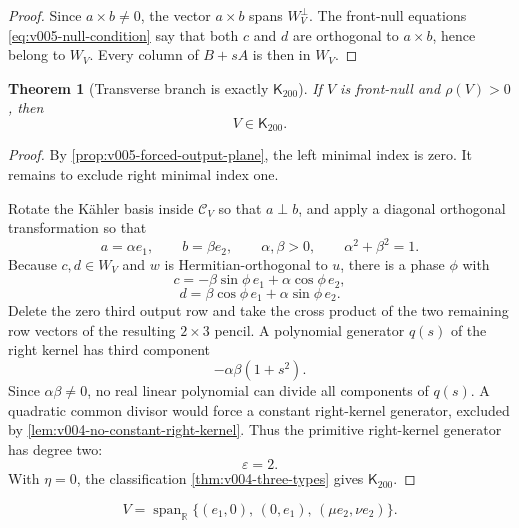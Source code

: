 \documentclass[10pt]{article}
\newtheorem{theorem}{Theorem}[section]
\newcommand{\R}{\mathbb R}
\begin{document}
\begin{proof}
Since \(a\times b\neq0\), the vector \(a\times b\) spans \(W_V^\perp\).  The front-null equations
\eqref{eq:v005-null-condition} say that both \(c\) and \(d\) are orthogonal to \(a\times b\),
hence belong to \(W_V\).  Every column of \(B+sA\) is then in \(W_V\).
\end{proof}

\begin{theorem}[Transverse branch is exactly \(\mathsf K_{200}\)]
\label{thm:v005-transverse-K200}
If \(V\) is front-null and \(\rho(V)>0\), then
\begin{equation}
\label{eq:v005-transverse-K200}
\boxed{
V\in\mathsf K_{200}.
}
\end{equation}
\end{theorem}

\begin{proof}
By \cref{prop:v005-forced-output-plane}, the left minimal index is zero.  It remains to exclude
right minimal index one.

Rotate the K\"ahler basis inside \(\mathcal C_V\) so that \(a\perp b\), and apply a diagonal
orthogonal transformation so that
\[
a=\alpha e_1,
\qquad
b=\beta e_2,
\qquad
\alpha,\beta>0,
\qquad
\alpha^2+\beta^2=1.
\]
Because \(c,d\in W_V\) and \(w\) is Hermitian-orthogonal to \(u\), there is a phase \(\phi\) with
\[
c=
-\beta\sin\phi\,e_1
+
\alpha\cos\phi\,e_2,
\]
\[
d=
\beta\cos\phi\,e_1
+
\alpha\sin\phi\,e_2.
\]
Delete the zero third output row and take the cross product of the two remaining row vectors of the
resulting \(2\times3\) pencil.  A polynomial generator \(q(s)\) of the right kernel has third
component
\[
-\alpha\beta(1+s^2).
\]
Since \(\alpha\beta\neq0\), no real linear polynomial can divide all components of \(q(s)\).  A
quadratic common divisor would force a constant right-kernel generator, excluded by
\cref{lem:v004-no-constant-right-kernel}.  Thus the primitive right-kernel generator has degree two:
\[
\varepsilon=2.
\]
With \(\eta=0\), the classification \cref{thm:v004-three-types} gives
\(\mathsf K_{200}\).
\end{proof}

\begin{equation}
\label{eq:v005-K101-gauge}
\boxed{
V
=
\operatorname{span}_{\R}
\{
(e_1,0),\,
(0,e_1),\,
(\mu e_2,\nu e_2)
\}.
}
\end{equation}
\end{document}
